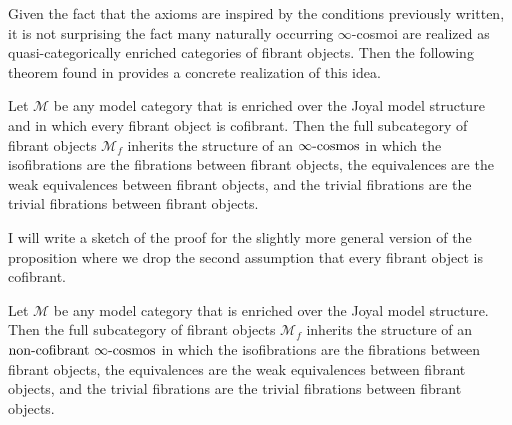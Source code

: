 Given the fact that the axioms are inspired by the conditions previously written, it is not surprising the fact many naturally occurring $\infty$-cosmoi are realized as quasi-categorically enriched categories of fibrant objects. Then the following theorem found in \cite{RV-elements} provides a concrete realization of this idea.

\begin{thm} \label{fibrantonenrinchment}
   Let $\mathcal{M}$ be any model category that is enriched over the Joyal model structure and in which every fibrant object is cofibrant. Then the full subcategory of fibrant objects $\mathcal{M}_f$ inherits the structure of an $\infty\text{-cosmos}$ in which the isofibrations are the fibrations between fibrant objects, the equivalences are the weak equivalences between fibrant objects, and the trivial fibrations are the trivial fibrations between fibrant objects.
\end{thm}

I will write a sketch of the proof for the slightly more general version of the proposition where we drop the second assumption that every fibrant object is cofibrant.

\begin{prop}
    Let $\mathcal{M}$ be any model category that is enriched over the Joyal model structure. Then the full subcategory of fibrant objects $\mathcal{M}_f$ inherits the structure of an $\text{non-cofibrant }\infty\text{-cosmos}$ in which the isofibrations are the fibrations between fibrant objects, the equivalences are the weak equivalences between fibrant objects, and the trivial fibrations are the trivial fibrations between fibrant objects.
\end{prop}

